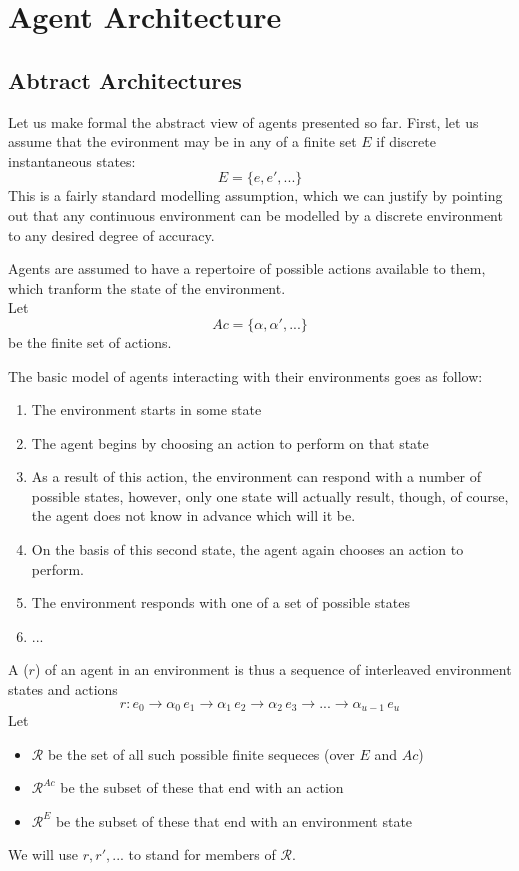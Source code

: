 \chapter{Agent Architecture}
\minitoc

\section{Abtract Architectures}
Let us make formal the abstract view of agents presented so far. First, let us assume that the evironment may be in any of a finite set $E$ if discrete instantaneous states:
\[E = \{e, e',...\}\]
This is a fairly standard modelling assumption, which we can justify by pointing out that any continuous environment can be modelled by a discrete environment to any desired degree of accuracy.

Agents are assumed to have a repertoire of possible actions available to them, which tranform the state of the environment. \\
Let
\[Ac = \{\alpha, \alpha',...\}\]
be the finite set of actions.

The basic model of agents interacting with their environments goes as follow:
\begin{enumerate}
\item The environment starts in some state
\item The agent begins by choosing an action to perform on that state
\item As a result of this action, the environment can respond with a number of possible states, however, only one state will actually result, though, of course, the agent does not know in advance which will it be.
\item On the basis of this second state, the agent again chooses an action to perform.
\item The environment responds with one of a set of possible states
\item ...
\end{enumerate}

A  ($r$) of an agent in an environment is thus a sequence of interleaved environment states and actions
\[r: e_0 \rightarrow \alpha_0\,e_1\rightarrow \alpha_1\,e_2\rightarrow \alpha_2\,e_3\rightarrow ... \rightarrow \alpha_{u-1}\,e_u\]
Let 
\begin{itemize}
\item $\mathcal{R}$ be the set of all such possible finite sequeces (over $E$ and $Ac$)
\item $\mathcal{R}^{Ac}$ be the subset of these that end with an action
\item $\mathcal{R}^{E}$ be the subset of these that end with an environment state 
\end{itemize}
We will use $r, r', ...$ to stand for members of $\mathcal{R}$.

